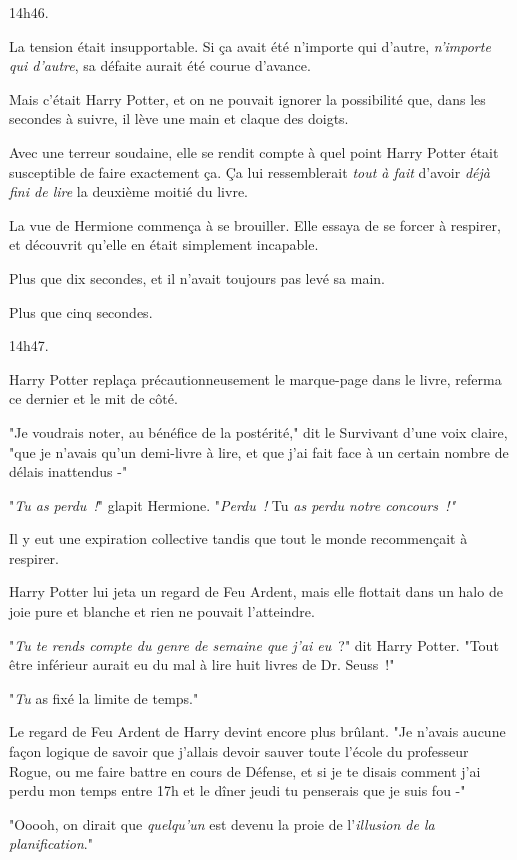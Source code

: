 14h46.

La tension était insupportable. Si ça avait été n'importe qui d'autre, \emph{n'importe qui d'autre}, sa défaite aurait été courue d'avance.

Mais c'était Harry Potter, et on ne pouvait ignorer la possibilité que, dans les secondes à suivre, il lève une main et claque des doigts.

Avec une terreur soudaine, elle se rendit compte à quel point Harry Potter était susceptible de faire exactement ça. Ça lui ressemblerait \emph{tout à fait} d'avoir \emph{déjà fini de lire} la deuxième moitié du livre.

La vue de Hermione commença à se brouiller. Elle essaya de se forcer à respirer, et découvrit qu'elle en était simplement incapable.

Plus que dix secondes, et il n'avait toujours pas levé sa main.

Plus que cinq secondes.

14h47.

Harry Potter replaça précautionneusement le marque-page dans le livre, referma ce dernier et le mit de côté.

"Je voudrais noter, au bénéfice de la postérité," dit le Survivant d'une voix claire, "que je n'avais qu'un demi-livre à lire, et que j'ai fait face à un certain nombre de délais inattendus -"

"\emph{Tu as perdu~!}" glapit Hermione. "\emph{Perdu~!} Tu \emph{as perdu notre concours~!"}

Il y eut une expiration collective tandis que tout le monde recommençait à respirer.

Harry Potter lui jeta un regard de Feu Ardent, mais elle flottait dans un halo de joie pure et blanche et rien ne pouvait l'atteindre.

"\emph{Tu te rends compte du genre de semaine que j'ai eu}~?" dit Harry Potter. "Tout être inférieur aurait eu du mal à lire huit livres de Dr. Seuss~!"

"\emph{Tu} as fixé la limite de temps."

Le regard de Feu Ardent de Harry devint encore plus brûlant. "Je n'avais aucune façon logique de savoir que j'allais devoir sauver toute l'école du professeur Rogue, ou me faire battre en cours de Défense, et si je te disais comment j'ai perdu mon temps entre 17h et le dîner jeudi tu penserais que je suis fou -"

"Ooooh, on dirait que \emph{quelqu'un} est devenu la proie de l'\emph{illusion de la planification}."


